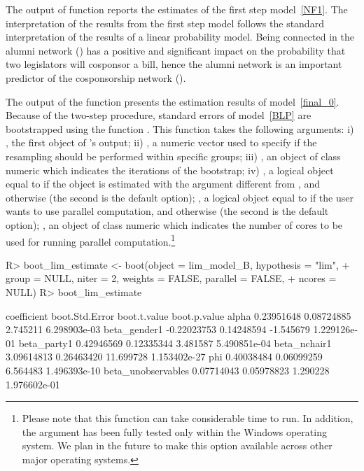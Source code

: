 \documentclass[nojss]{jss}
\begin{document}
The output of function  reports the estimates of the first step model~\ref{NF1}.  The interpretation of the results from the first step model follows the standard interpretation of the results of a linear probability model. Being connected in the alumni network () has a positive and significant impact on the probability that two legislators will cosponsor a bill, hence the alumni network is an important predictor of the cosponsorship network ().

The output of the function  presents the estimation results of model~\ref{final_0}. Because of the two-step procedure, standard errors of model~\ref{BLP} are bootstrapped using the function . This function takes the following arguments: i) , the first object of 's output; ii) , a numeric vector used to specify if the resampling should be performed within specific groups; iii) , an object of class numeric which indicates the iterations of the bootstrap; iv) 
, a logical object equal to  if the object  is estimated with the argument  different from , and  otherwise (the second is the default option); , a logical object equal to  if the user wants to use parallel computation, and  otherwise (the second is the default option); , an object of class numeric which indicates the number of cores to be used for running parallel computation.\footnote{Please note that this function can take considerable time to run. In addition, the argument  has been fully tested only within the Windows operating system. We plan in the future to make this option available across other major operating systems.}
\begin{CodeChunk}
\begin{CodeInput}
R>  boot_lim_estimate <- boot(object = lim_model_B, hypothesis = "lim",
+    group = NULL, niter = 2, weights = FALSE, parallel = FALSE, 
+    ncores = NULL)
R>  boot_lim_estimate
\end{CodeInput}
\begin{CodeOutput}
		  coefficient boot.Std.Error boot.t.value boot.p.value
alpha               0.23951648     0.08724885     2.745211 6.298903e-03
beta_gender1       -0.22023753     0.14248594    -1.545679 1.229126e-01
beta_party1         0.42946569     0.12335344     3.481587 5.490851e-04
beta_nchair1        3.09614813     0.26463420    11.699728 1.153402e-27
phi                 0.40038484     0.06099259     6.564483 1.496393e-10
beta_unobservables  0.07714043     0.05978823     1.290228 1.976602e-01
\end{CodeOutput}
\end{CodeChunk}
\end{document}
